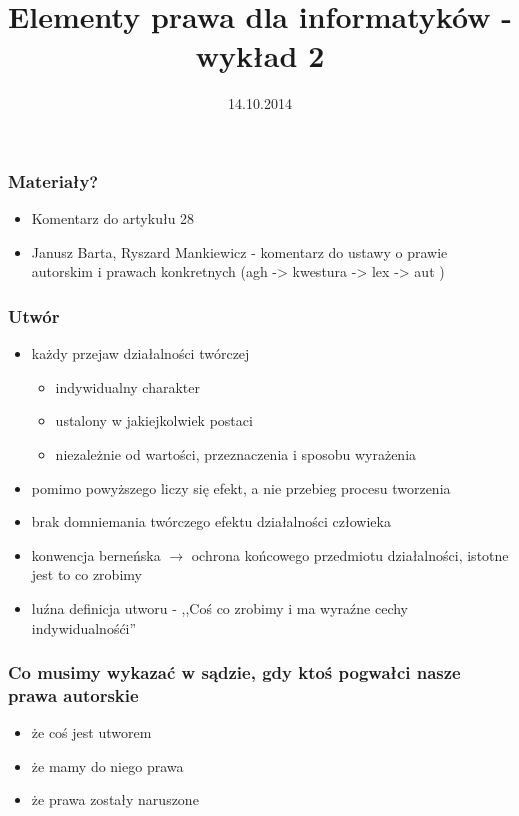 \documentclass[12pt,a4paper]{article}
\title{Elementy prawa dla informatyków - wykład 2}
\author{}
\date{14.10.2014}
\begin{document}
\maketitle

\subsubsection{Materiały?}
\begin{itemize}
\item Komentarz do artykułu 28
\item Janusz Barta, Ryszard Mankiewicz - komentarz do ustawy o prawie autorskim i prawach konkretnych (agh -> kwestura -> lex -> aut )
\end{itemize}


\subsubsection{Utwór}
\begin{itemize}
\item każdy przejaw działalności twórczej
	\begin{itemize}
	\item indywidualny charakter
	\item ustalony w jakiejkolwiek postaci
	\item niezależnie od wartości, przeznaczenia i sposobu wyrażenia
	\end{itemize}
\item pomimo powyższego liczy się efekt, a nie przebieg procesu tworzenia
\item brak domniemania twórczego efektu działalności człowieka
\item konwencja berneńska $\rightarrow$ ochrona końcowego przedmiotu działalności, istotne jest to co zrobimy	
\item luźna definicja utworu - ,,Coś co zrobimy i ma wyraźne cechy indywidualnośći''
\end{itemize}

\subsubsection{Co musimy wykazać w sądzie, gdy ktoś pogwałci nasze prawa autorskie}
\begin{itemize}
\item że coś jest utworem
\item że mamy do niego prawa
\item że prawa zostały naruszone
\end{itemize}
\end{document}
